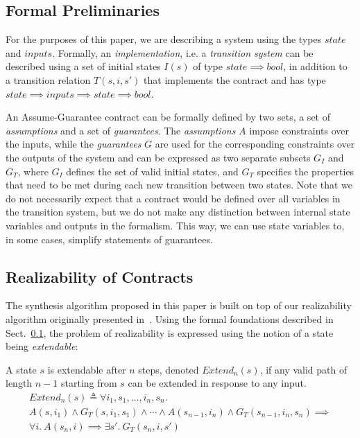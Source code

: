 \subsection{Formal Preliminaries}
\label{sec:pre}

For the purposes of this paper, we are describing a system using the types
$state$ and $inputs$. Formally, an \emph{implementation}, i.e. a
\emph{transition system} can be described using a set of initial states $I(s)$ of type $state \implies bool$, in addition to a transition relation $T(s,i,s')$ that
implements the contract and has type $state \implies inputs \implies
state \implies bool$.
 
An Assume-Guarantee contract can be formally defined by two sets, a set of
\emph{assumptions} and a set of \emph{guarantees}. The \emph{assumptions} $A$
impose constraints over the inputs, while the \emph{guarantees} $G$ are used for
the corresponding constraints over the outputs of the system and can be expressed as
two separate subsets $G_I$ and $G_T$, where $G_I$ defines the set of valid
initial states, and $G_T$ specifies the properties that need to be met during
each new transition between two states. Note that we do not necessarily expect
that a contract would be defined over all variables in the transition system,
but we do not make any distinction between internal state variables and outputs in the formalism.
This way, we can use state variables to, in some cases, simplify statements of guarantees.

\subsection{Realizability of Contracts}
The synthesis algorithm proposed in this paper is built on top of our realizability algorithm
originally presented in~\cite{Katis15:Realizability}. Using the formal foundations described in Sect.~\ref{sec:pre},
the problem of realizability is expressed using the notion of a state being \emph{extendable}:

\begin{definition}
\label{def:extend}
A state $s$ is extendable after $n$ steps, denoted $\mathit{Extend}_{n}(s)$, if
any valid path of length $n-1$ starting from $s$ can be extended in response to
any input.%
%
\begin{multline*}%
\mathit{Extend}_{n}(s) \triangleq \forall i_1, s_1, \ldots, i_n, s_n.\\ A(s, i_1) \land G_T(s, i_1, s_1)
\land \cdots \land
A(s_{n-1}, i_n) \land G_T(s_{n-1}, i_n, s_n)
\implies \\
\forall i.~ A(s_n, i) \implies \exists s'.~ G_T(s_n, i, s')
\end{multline*}
\end{definition}

